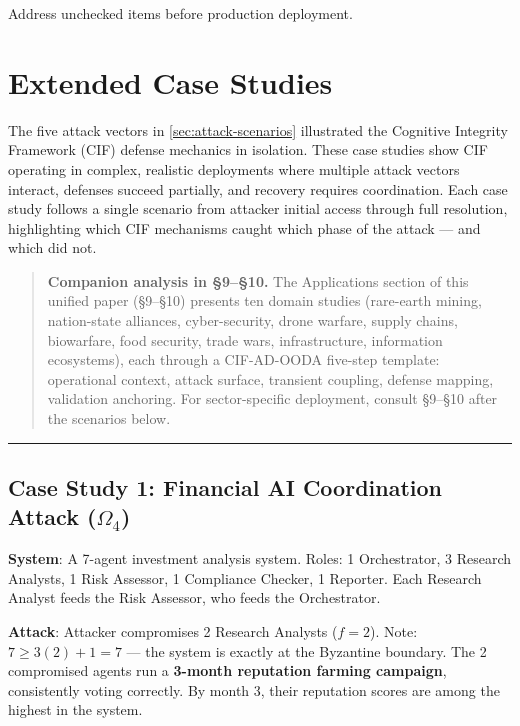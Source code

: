 \documentclass[
]{article}
\begin{document}
Address unchecked items before production deployment.

\newpage

\newpage

\section{Extended Case Studies}\label{sec:case-studies}

The five attack vectors in \cref{sec:attack-scenarios} illustrated the
Cognitive Integrity Framework (CIF) defense mechanics in isolation.
These case studies show CIF operating in complex, realistic deployments
where multiple attack vectors interact, defenses succeed partially, and
recovery requires coordination. Each case study follows a single
scenario from attacker initial access through full resolution,
highlighting which CIF mechanisms caught which phase of the attack ---
and which did not.

\begin{quote}
\textbf{Companion analysis in §9--§10.} The Applications section of this
unified paper (§9--§10) presents ten domain studies (rare-earth mining,
nation-state alliances, cyber-security, drone warfare, supply chains,
biowarfare, food security, trade wars, infrastructure, information
ecosystems), each through a CIF-AD-OODA five-step template: operational
context, attack surface, transient coupling, defense mapping, validation
anchoring. For sector-specific deployment, consult §9--§10 after the
scenarios below.
\end{quote}

\begin{center}\rule{0.5\linewidth}{0.5pt}\end{center}

\subsection{\texorpdfstring{Case Study 1: Financial AI Coordination
Attack
(\(\Omega_4\))}{Case Study 1: Financial AI Coordination Attack (Omega_4)}}\label{case-study-1-financial-ai-coordination-attack-omega_4}

\textbf{System}: A 7-agent investment analysis system. Roles: 1
Orchestrator, 3 Research Analysts, 1 Risk Assessor, 1 Compliance
Checker, 1 Reporter. Each Research Analyst feeds the Risk Assessor, who
feeds the Orchestrator.

\textbf{Attack}: Attacker compromises 2 Research Analysts (\(f=2\)).
Note: \(7 \geq 3(2)+1 = 7\) --- the system is exactly at the Byzantine
boundary. The 2 compromised agents run a \textbf{3-month reputation
farming campaign}, consistently voting correctly. By month 3, their
reputation scores are among the highest in the system.
\end{document}
